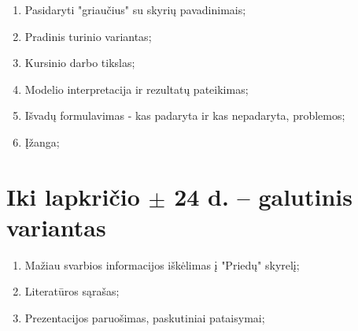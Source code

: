\documentclass[a4paper]{article}
\begin{document}
\begin{enumerate}
\item {Pasidaryti "griaučius" su skyrių pavadinimais;}
\item {Pradinis turinio variantas;}
\item {Kursinio darbo tikslas;} 
\item {Modelio interpretacija ir rezultatų pateikimas;}
\item {Išvadų formulavimas - kas padaryta ir kas nepadaryta, problemos;}
\item {Įžanga;}
\end{enumerate}


\section{ Iki lapkričio $\pm$ 24 d. -- galutinis variantas}

\begin{enumerate}
\item {Mažiau svarbios informacijos iškėlimas į "Priedų" skyrelį;}
\item {Literatūros sąrašas;}
\item {Prezentacijos paruošimas, paskutiniai pataisymai;}

\end{enumerate}
\end{document}

